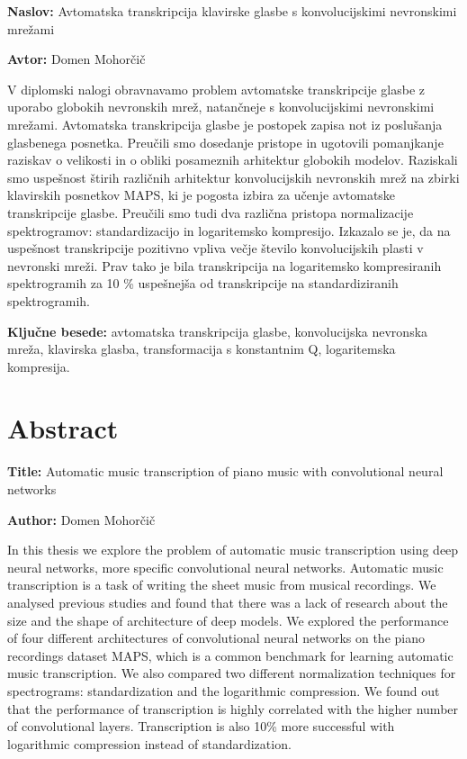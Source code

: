 \documentclass[a4paper, 12pt, openright]{book}
\newcommand{\ttitle}{Avtomatska transkripcija klavirske glasbe s konvolucijskimi nevronskimi mrežami}
\newcommand{\ttitleEn}{Automatic music transcription of piano music with convolutional neural networks}
\newcommand{\tauthor}{Domen Mohorčič}
\newcommand{\tkeywords}{avtomatska transkripcija glasbe, konvolucijska nevronska mreža, klavirska glasba, transformacija s konstantnim Q, logaritemska kompresija}
\newcommand{\clearemptydoublepage}{\newpage{\pagestyle{empty}\cleardoublepage}}
\begin{document}
\noindent\textbf{Naslov:} \ttitle
\bigskip

\noindent\textbf{Avtor:} \tauthor
\bigskip

\noindent V diplomski nalogi obravnavamo problem avtomatske transkripcije glasbe z uporabo globokih nevronskih mrež, natančneje s konvolucijskimi nevronskimi mrežami.
Avtomatska transkripcija glasbe je postopek zapisa not iz poslušanja glasbenega posnetka.
Preučili smo dosedanje pristope in ugotovili pomanjkanje raziskav o velikosti in o obliki posameznih arhitektur globokih modelov.
Raziskali smo uspešnost štirih različnih arhitektur konvolucijskih nevronskih mrež na zbirki klavirskih posnetkov MAPS, ki je pogosta izbira za učenje avtomatske transkripcije glasbe.
Preučili smo tudi dva različna pristopa normalizacije spektrogramov: standardizacijo in logaritemsko kompresijo.
Izkazalo se je, da na uspešnost transkripcije pozitivno vpliva večje število konvolucijskih plasti v nevronski mreži.
Prav tako je bila transkripcija na logaritemsko kompresiranih spektrogramih za 10 \% uspešnejša od transkripcije na standardiziranih spektrogramih.

\bigskip

\noindent\textbf{Ključne besede:} \tkeywords.


\clearemptydoublepage


\chapter*{Abstract}

\noindent\textbf{Title:} \ttitleEn
\bigskip

\noindent\textbf{Author:} \tauthor
\bigskip

\noindent In this thesis we explore the problem of automatic music transcription using deep neural networks, more specific convolutional neural networks.
Automatic music transcription is a task of writing the sheet music from musical recordings.
We analysed previous studies and found that there was a lack of research about the size and the shape of architecture of deep models.
We explored the performance of four different architectures of convolutional neural networks on the piano recordings dataset MAPS, which is a common benchmark for learning automatic music transcription.
We also compared two different normalization techniques for spectrograms: standardization and the logarithmic compression.
We found out that the performance of transcription is highly correlated with the higher number of convolutional layers.
Transcription is also 10\% more successful with logarithmic compression instead of standardization.
\end{document}
